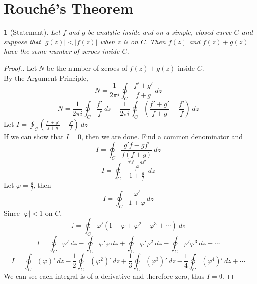 \documentclass[12pt]{article}
\theoremstyle{named}
\newtheorem*{theorem}{}
\begin{document}
\section{Rouch\'{e}'s Theorem}
\begin{theorem}[Statement]
	Let $f$ and $g$ be analytic inside and on a simple, closed curve $C$ and suppose that
	$|g(z)| < |f(z)|$ when $z$ is on $C$.  Then $f(z)$ and $f(z) + g(z)$ have the same number
	of zeroes inside $C$.
\end{theorem}
\begin{proof}[Proof.]
Let $N$ be the number of zeroes of $f(z) + g(z)$ inside $C$.
\\By the Argument Principle,
$$ N = \frac{1}{2\pi i} \oint_C \frac{f' + g'}{f + g} ~dz $$
$$ N = \frac{1}{2\pi i} \oint_C \frac{f'}{f} ~dz + \frac{1}{2\pi i} \oint_C \left(\frac{f' + g'}{f + g} - \frac{f'}{f} \right) ~dz$$
Let $I = \oint_C \left(\frac{f' + g'}{f + g} - \frac{f'}{f} \right) ~dz$
\\If we can show that $I = 0$, then we are done.  Find a common denominator and
$$ I = \oint_C \frac{g'f - gf'}{f(f+g)} ~dz $$
$$ I = \oint_C \frac{\frac{g'f - gf'}{f^2}}{1+\frac{g}{f}} ~dz $$
Let $\varphi = \frac{g}{f}$, then
$$ I = \oint_C \frac{\varphi '}{1 + \varphi} ~dz $$
Since $|\varphi| < 1$ on $C$,
$$ I = \oint_C \varphi '(1 - \varphi + \varphi^2 - \varphi^3 + \cdots) ~dz $$
$$ I = \oint_C \varphi ' ~dz - \oint_C \varphi '\varphi ~dz +\oint_C \varphi '\varphi^2 ~dz - \oint_C \varphi '\varphi^3 ~dz + \cdots $$
$$ I = \oint_C (\varphi)' ~dz - \frac{1}{2}\oint_C (\varphi^2)' ~dz + \frac{1}{3}\oint_C (\varphi^3)' ~dz - \frac{1}{4}\oint_C (\varphi^4)' ~dz + \cdots $$
We can see each integral is of a derivative and therefore zero, thus $I = 0$.
\end{proof}

%
\end{document}

